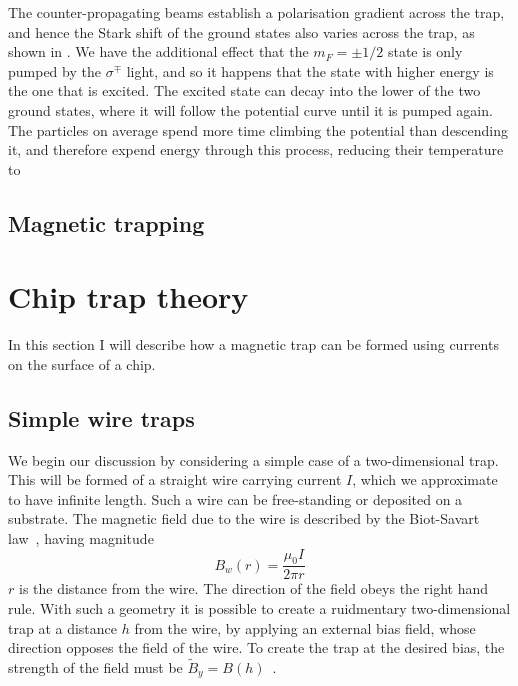 The counter-propagating beams establish a polarisation gradient across the
trap, and hence the Stark shift of the ground states also varies across the
trap, as shown in \myfigref{}. We have the additional effect that the
$m_F=\pm1/2$ state is only pumped by the $\sigma^\mp$ light, and so it happens
that the state with higher energy is the one that is excited. The excited state
can decay into the lower of the two ground states, where it will follow the
potential curve until it is pumped again. The particles on average spend more
time climbing the potential than descending it, and therefore expend energy
through this process, reducing their temperature to 


\subsection{Magnetic trapping}

\section{Chip trap theory}
\label{theory:chips}

In this section I will describe how a magnetic trap can be formed using
currents on the surface of a chip.

\subsection{Simple wire traps}

We begin our discussion by considering a simple case of a two-dimensional trap.
This will be formed of a straight wire carrying current $I$, which we
approximate to have infinite length. Such a wire can be free-standing or
deposited on a substrate.  The magnetic field due to the wire is described by
the Biot-Savart law~\cite{}, having magnitude
%
\begin{equation}
  B_w(r) = \frac{\mu_0 I}{2 \pi r}
\end{equation}
%
$r$ is the distance from the wire. The direction of the field obeys the right
hand rule. With such a geometry it is possible to create a ruidmentary
two-dimensional trap at a distance $h$ from the wire, by applying an external
bias field, whose direction opposes the field of the wire. To create the trap
at the desired bias, the strength of the field must be $\tilde{B}_y =
B(h)$~\cite{2011Ac}.

